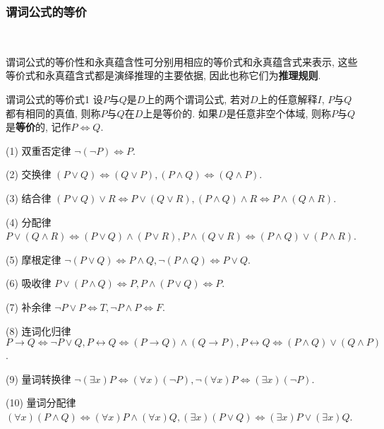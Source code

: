 \subsubsection{谓词公式的等价}~{}

谓词公式的等价性和永真蕴含性可分别用相应的等价式和永真蕴含式来表示, 这些等价式和永真蕴含式都是演绎推理的主要依据, 因此也称它们为\textbf{推理规则}.

\begin{mydef}{谓词公式的等价式}{1}
设$P$与$Q$是$D$上的两个谓词公式, 若对$D$上的任意解释$I$, $P$与$Q$都有相同的真值, 则称$P$与$Q$在$D$上是等价的. 如果$D$是任意非空个体域, 则称$P$与$Q$是\textbf{等价}的, 记作$P\Leftrightarrow Q$.
\end{mydef}

(1) 双重否定律      $\neg(\neg P) \Leftrightarrow P$.

(2) 交换律               $(P\vee Q) \Leftrightarrow  (Q\vee P),  ( P\wedge Q) \Leftrightarrow  ( Q\wedge P)$.

(3) 结合律               $(P\vee Q)\vee R \Leftrightarrow  P\vee (Q\vee R),
               (P\wedge Q)\wedge R \Leftrightarrow P\wedge (Q\wedge R)$.

(4) 分配律               $P\vee (Q\wedge R) \Leftrightarrow (P\vee Q)\wedge (P\vee R),
               P\wedge (Q\vee R) \Leftrightarrow (P\wedge Q)\vee (P\wedge R)$.

(5) 摩根定律        $\neg  (P\vee Q) \Leftrightarrow P\wedge Q,
              \neg  (P\wedge Q) \Leftrightarrow P\vee Q$.

(6) 吸收律              $ P\vee (P\wedge Q) \Leftrightarrow P,
                P\wedge (P\vee Q) \Leftrightarrow P$.

(7) 补余律               $\neg P\vee P \Leftrightarrow T, \neg  P\wedge P \Leftrightarrow F$.

(8) 连词化归律      $ P\rightarrow Q \Leftrightarrow  \neg P\vee Q,
               P\longleftrightarrow Q \Leftrightarrow (P\rightarrow Q)\wedge (Q\rightarrow P),
               P\longleftrightarrow Q \Leftrightarrow (P\wedge Q)\vee (Q\wedge P)$.

(9) 量词转换律     $ \neg  (\exists x)P \Leftrightarrow (\forall x)( \neg  P), \neg (\forall x)P \Leftrightarrow (\exists x) (\neg  P)$.

(10) 量词分配律    $(\forall x) (P\wedge Q) \Leftrightarrow (\forall x)P\wedge (\forall x)Q, (\exists x) (P\vee Q) \Leftrightarrow  (\exists x)P\vee (\exists x)Q$.

